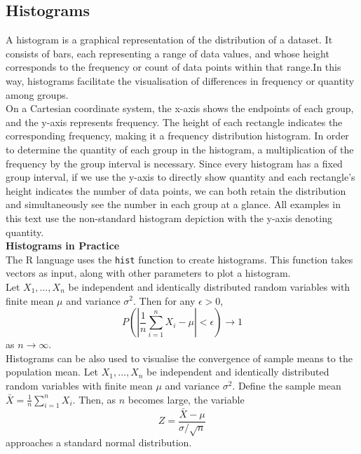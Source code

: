 \documentclass{article}\usepackage[]{graphicx}\usepackage[]{xcolor}
\numberwithin{equation}{section}
\begin{document}
\subsection{Histograms}

A histogram is a graphical representation of the distribution of a dataset. It consists of bars, each representing a range of data values, and whose height corresponds to the frequency or count of data points within that range.In this way, histograms facilitate the visualisation of differences in frequency or quantity among groups.\\

\noindent On a Cartesian coordinate system, the x-axis shows the endpoints of each group, and the y-axis represents frequency. The height of each rectangle indicates the corresponding frequency, making it a frequency distribution histogram. In order to determine the quantity of each group in the histogram, a multiplication of the frequency by the group interval is necessary. Since every histogram has a fixed group interval, if we use the y-axis to directly show quantity and each rectangle's height indicates the number of data points, we can both retain the distribution and simultaneously see the number in each group at a glance. All examples in this text use the non-standard histogram depiction with the y-axis denoting quantity.\\

\noindent
\textbf{Histograms in Practice}\\
\noindent The R language uses the \texttt{hist} function to create histograms. This function takes vectors as input, along with other parameters to plot a histogram.\\

\noindent Let \(X_1, \ldots, X_n\) be independent and identically distributed random variables with finite mean \( \mu \) and variance \( \sigma^2 \). Then for any \( \epsilon > 0 \), 
\[ P\left(\left|\frac{1}{n}\sum_{i=1}^n X_i - \mu\right| < \epsilon\right) \rightarrow 1 \] 
as \( n \rightarrow \infty \).\\

\noindent Histograms can be also used to visualise the convergence of sample means to the population mean. Let \(X_1, \ldots, X_n\) be independent and identically distributed random variables with finite mean \( \mu \) and variance \( \sigma^2 \). Define the sample mean \( \bar{X} = \frac{1}{n}\sum_{i=1}^n X_i \). Then, as \( n \) becomes large, the variable 
\[ Z = \frac{\bar{X} - \mu}{\sigma/\sqrt{n}} \] approaches a standard normal distribution.\\
\end{document}
